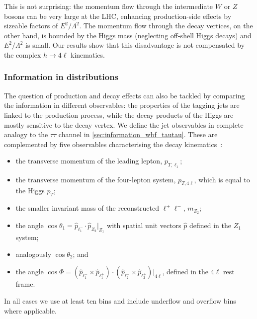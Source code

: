 This is not surprising: the momentum flow through the intermediate $W$
or $Z$ bosons can be very large at the LHC, enhancing production-side
effects by sizeable factors of $E^2 / \Lambda^2$. The momentum flow
through the decay vertices, on the other hand, is bounded by the Higgs
mass (neglecting off-shell Higgs decays) and $E^2 / \Lambda^2$ is
small. Our results show that this disadvantage is not compensated by
the complex $h \to 4\ell$ kinematics.



\subsubsection*{Information in distributions}

The question of production and decay effects can also be tackled by
comparing the information in different observables: the properties of
the tagging jets are linked to the production process, while the decay
products of the Higgs are mostly sensitive to the decay vertex. We
define the jet observables in complete analogy to the $\tau \tau$
channel in \autoref{sec:information_wbf_tautau}. These are complemented
by five observables characterising the decay
kinematics~\cite{Bolognesi:2012mm, Englert:2012xt}:
%
\begin{itemize}
\item the transverse momentum of the leading lepton, $p_{T,\ell_1}$;
\item the transverse momentum of the four-lepton system, $p_{T,4\ell}$, which is equal to the Higgs $p_T$;
\item the smaller invariant mass of the reconstructed $\ell^+ \ell^-$, $m_{Z_2}$;
\item the angle $\cos \theta_1 = \hat{p}_{\ell^-_1} \cdot \hat{p}_{Z_2}
  \Big|_{Z_1}$ with spatial unit vectors $\hat{p}$ defined in the $Z_1$ system;
\item analogously $\cos \theta_2$; and
\item the angle
  $\cos \Phi = ( \hat{p}_{\ell^-_1} \times \hat{p}_{\ell^+_1} )
  \cdot ( \hat{p}_{\ell^-_2} \times \hat{p}_{\ell^+_2} ) \Big|_{4\ell}$,
  defined in the $4\ell$ rest frame.
\end{itemize}
%
In all cases we use at least ten bins and include underflow and
overflow bins where applicable.

